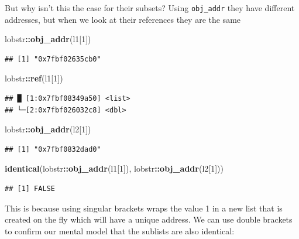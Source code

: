 \documentclass[]{book}
\newenvironment{Shaded}{\begin{snugshade}}{\end{snugshade}}
\newcommand{\DecValTok}[1]{\textcolor[rgb]{0.00,0.00,0.81}{#1}}
\newcommand{\KeywordTok}[1]{\textcolor[rgb]{0.13,0.29,0.53}{\textbf{#1}}}
\newcommand{\NormalTok}[1]{#1}
\newcommand{\OperatorTok}[1]{\textcolor[rgb]{0.81,0.36,0.00}{\textbf{#1}}}
\begin{document}
But why isn't this the case for their subsets? Using \texttt{obj\_addr} they have different addresses, but when we look at their references they are the same

\begin{Shaded}
\begin{Highlighting}[]
\NormalTok{lobstr}\OperatorTok{::}\KeywordTok{obj_addr}\NormalTok{(l1[}\DecValTok{1}\NormalTok{])}
\end{Highlighting}
\end{Shaded}

\begin{verbatim}
## [1] "0x7fbf02635cb0"
\end{verbatim}

\begin{Shaded}
\begin{Highlighting}[]
\NormalTok{lobstr}\OperatorTok{::}\KeywordTok{ref}\NormalTok{(l1[}\DecValTok{1}\NormalTok{])}
\end{Highlighting}
\end{Shaded}

\begin{verbatim}
## █ [1:0x7fbf08349a50] <list> 
## └─[2:0x7fbf026032c8] <dbl>
\end{verbatim}

\begin{Shaded}
\begin{Highlighting}[]
\NormalTok{lobstr}\OperatorTok{::}\KeywordTok{obj_addr}\NormalTok{(l2[}\DecValTok{1}\NormalTok{])}
\end{Highlighting}
\end{Shaded}

\begin{verbatim}
## [1] "0x7fbf0832dad0"
\end{verbatim}

\begin{Shaded}
\begin{Highlighting}[]
\KeywordTok{identical}\NormalTok{(lobstr}\OperatorTok{::}\KeywordTok{obj_addr}\NormalTok{(l1[}\DecValTok{1}\NormalTok{]), lobstr}\OperatorTok{::}\KeywordTok{obj_addr}\NormalTok{(l2[}\DecValTok{1}\NormalTok{]))}
\end{Highlighting}
\end{Shaded}

\begin{verbatim}
## [1] FALSE
\end{verbatim}

This is because using singular brackets wraps the value 1 in a new list that is created on the fly which will have a unique address. We can use double brackets to confirm our mental model that the sublists are also identical:
\end{document}
